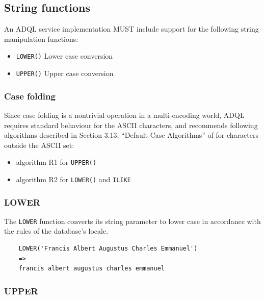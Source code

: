 \documentclass[11pt,a4paper]{ivoa}
\begin{document}
\subsection{String functions}
\label{sec:string.functions}

An ADQL service implementation MUST include support for the following string
manipulation functions:

\begin{itemize}
    \item \verb:LOWER(): Lower case conversion
    \item \verb:UPPER(): Upper case conversion
\end{itemize}

\subsubsection{Case folding}

Since case folding is a nontrivial operation in a multi-encoding world, ADQL
requires standard behaviour for the ASCII characters, and recommends
following algorithms described in Section 3.13, ``Default Case Algorithms''
of \citet{std:UNICODE} for characters outside the ASCII set:

\begin{itemize}
    \item algorithm R1 for \verb:UPPER():
    \item algorithm R2 for \verb:LOWER(): and \verb:ILIKE: 
\end{itemize}

\subsubsection{LOWER}
\label{sec:string.functions.lower}

The \texttt{LOWER} function converts its string parameter to lower case in
accordance with the rules of the database's locale.

\begin{verbatim}
    LOWER('Francis Albert Augustus Charles Emmanuel')
    =>
    francis albert augustus charles emmanuel
\end{verbatim}

\subsubsection{UPPER}
\label{sec:string.functions.upper}
\end{document}
